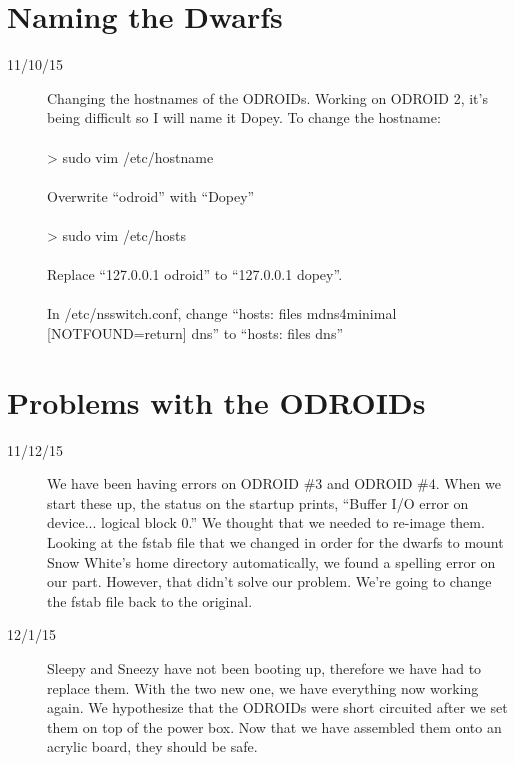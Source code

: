 \section{Naming the Dwarfs}
\begin{description}
\item[11/10/15] Changing the hostnames of the ODROIDs. Working on ODROID 2, it's being difficult so I will name it Dopey. To change the hostname: \\ \\
> sudo vim /etc/hostname \\ \\
Overwrite ``odroid'' with ``Dopey'' \\ \\
> sudo vim /etc/hosts \\ \\
Replace ``127.0.0.1 odroid'' to ``127.0.0.1 dopey''. \\ \\
In /etc/nsswitch.conf, change ``hosts: files mdns4\textunderscore minimal [NOTFOUND=return] dns'' to ``hosts: files dns''
\end{description}

\section{Problems with the ODROIDs}
\begin{description}
\item [11/12/15] We have been having errors on ODROID \#3 and ODROID \#4. When we start these up, the status on the startup prints, ``Buffer I/O error on device... logical block 0.'' We thought that we needed to re-image them. Looking at the fstab file that we changed in order for the dwarfs to mount Snow White's home directory automatically, we found a spelling error on our part. However, that didn't solve our problem. We're going to change the fstab file back to the original. \\
\item [12/1/15] Sleepy and Sneezy have not been booting up, therefore we have had to replace them. With the two new one, we have everything now working again. We hypothesize that the ODROIDs were short circuited after we set them on top of the power box. Now that we have assembled them onto an acrylic board, they should be safe.
\end{description}

